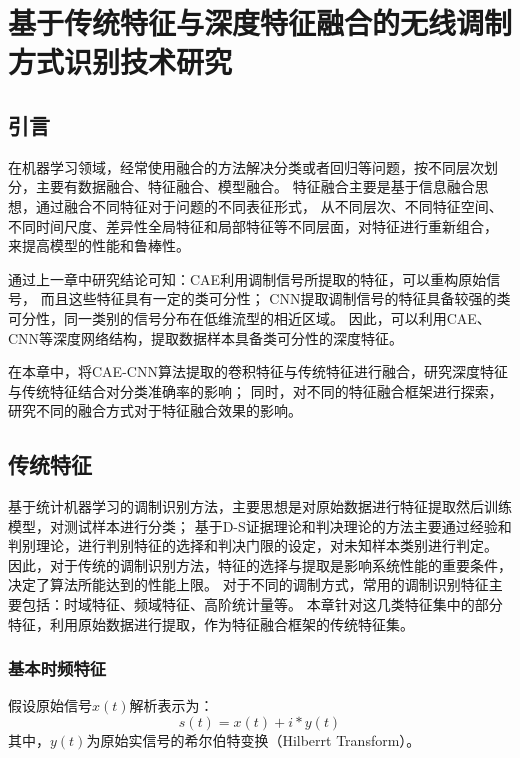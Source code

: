 \chapter{基于传统特征与深度特征融合的无线调制方式识别技术研究}
\section{引言}
在机器学习领域，经常使用融合的方法解决分类或者回归等问题，按不同层次划分，主要有数据融合、特征融合、模型融合。
特征融合主要是基于信息融合思想，通过融合不同特征对于问题的不同表征形式，
从不同层次、不同特征空间、不同时间尺度、差异性全局特征和局部特征等不同层面，对特征进行重新组合，
来提高模型的性能和鲁棒性\cite{刘渭滨2017模式分类中的特征融合方法}。\par

通过上一章中研究结论可知：CAE利用调制信号所提取的特征，可以重构原始信号，
而且这些特征具有一定的类可分性；
CNN提取调制信号的特征具备较强的类可分性，同一类别的信号分布在低维流型的相近区域。
因此，可以利用CAE、CNN等深度网络结构，提取数据样本具备类可分性的深度特征。\par

在本章中，将CAE-CNN算法提取的卷积特征与传统特征进行融合，研究深度特征与传统特征结合对分类准确率的影响；
同时，对不同的特征融合框架进行探索，研究不同的融合方式对于特征融合效果的影响。\par

\section{传统特征}
基于统计机器学习的调制识别方法，主要思想是对原始数据进行特征提取然后训练模型，对测试样本进行分类；
基于D-S证据理论和判决理论的方法主要通过经验和判别理论，进行判别特征的选择和判决门限的设定，对未知样本类别进行判定。
因此，对于传统的调制识别方法，特征的选择与提取是影响系统性能的重要条件，决定了算法所能达到的性能上限。
对于不同的调制方式，常用的调制识别特征主要包括：时域特征、频域特征、高阶统计量等。
本章针对这几类特征集中的部分特征，利用原始数据进行提取，作为特征融合框架的传统特征集。\par

\subsection{基本时频特征}

假设原始信号$x(t)$解析表示为：
\begin{equation}
\label{eqt_4_1}
s(t)=x(t)+i*y(t)
\end{equation}
其中，$y(t)$为原始实信号的希尔伯特变换（Hilberrt Transform）。\par

